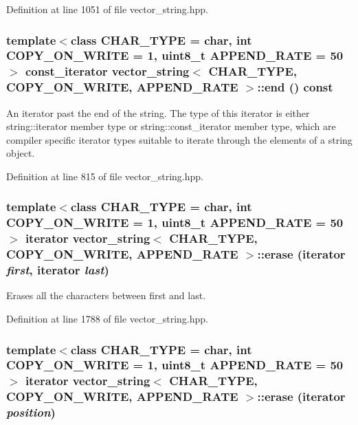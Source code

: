 Definition at line 1051 of file vector\_\-string.hpp.\hypertarget{classvector__string_e6d3431c0ea1a2e0152677b56230a4fa}{
\subsubsection[{end}]{\setlength{\rightskip}{0pt plus 5cm}template$<$class CHAR\_\-TYPE  = char, int COPY\_\-ON\_\-WRITE = 1, uint8\_\-t APPEND\_\-RATE = 50$>$ const\_\-iterator {\bf vector\_\-string}$<$ CHAR\_\-TYPE, COPY\_\-ON\_\-WRITE, APPEND\_\-RATE $>$::end () const}}
\label{classvector__string_e6d3431c0ea1a2e0152677b56230a4fa}


An iterator past the end of the string. The type of this iterator is either string::iterator member type or string::const\_\-iterator member type, which are compiler specific iterator types suitable to iterate through the elements of a string object. 

Definition at line 815 of file vector\_\-string.hpp.\hypertarget{classvector__string_c18e5c85d57d5b27357119228d9639c6}{
\subsubsection[{erase}]{\setlength{\rightskip}{0pt plus 5cm}template$<$class CHAR\_\-TYPE  = char, int COPY\_\-ON\_\-WRITE = 1, uint8\_\-t APPEND\_\-RATE = 50$>$ iterator {\bf vector\_\-string}$<$ CHAR\_\-TYPE, COPY\_\-ON\_\-WRITE, APPEND\_\-RATE $>$::erase (iterator {\em first}, \/  iterator {\em last})}}
\label{classvector__string_c18e5c85d57d5b27357119228d9639c6}


Erases all the characters between first and last. 

Definition at line 1788 of file vector\_\-string.hpp.\hypertarget{classvector__string_26b9ec8489b4a06280b098fa272aaeab}{
\subsubsection[{erase}]{\setlength{\rightskip}{0pt plus 5cm}template$<$class CHAR\_\-TYPE  = char, int COPY\_\-ON\_\-WRITE = 1, uint8\_\-t APPEND\_\-RATE = 50$>$ iterator {\bf vector\_\-string}$<$ CHAR\_\-TYPE, COPY\_\-ON\_\-WRITE, APPEND\_\-RATE $>$::erase (iterator {\em position})}}
\label{classvector__string_26b9ec8489b4a06280b098fa272aaeab}


